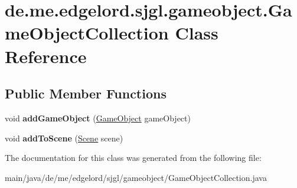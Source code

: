 \hypertarget{classde_1_1me_1_1edgelord_1_1sjgl_1_1gameobject_1_1_game_object_collection}{}\section{de.\+me.\+edgelord.\+sjgl.\+gameobject.\+Game\+Object\+Collection Class Reference}
\label{classde_1_1me_1_1edgelord_1_1sjgl_1_1gameobject_1_1_game_object_collection}
\subsection*{Public Member Functions}
\begin{DoxyCompactItemize}
\item 
\mbox{\label{classde_1_1me_1_1edgelord_1_1sjgl_1_1gameobject_1_1_game_object_collection_add4eca6437d0050b1df51d265f3b2f3c}} 
void {\bfseries add\+Game\+Object} (\mbox{\hyperlink{classde_1_1me_1_1edgelord_1_1sjgl_1_1gameobject_1_1_game_object}{Game\+Object}} game\+Object)
\item 
\mbox{\label{classde_1_1me_1_1edgelord_1_1sjgl_1_1gameobject_1_1_game_object_collection_a2d91d2201a00d8e3954638f7c50413ea}} 
void {\bfseries add\+To\+Scene} (\mbox{\hyperlink{classde_1_1me_1_1edgelord_1_1sjgl_1_1scene_1_1_scene}{Scene}} scene)
\end{DoxyCompactItemize}


The documentation for this class was generated from the following file\+:\begin{DoxyCompactItemize}
\item 
main/java/de/me/edgelord/sjgl/gameobject/Game\+Object\+Collection.\+java\end{DoxyCompactItemize}
